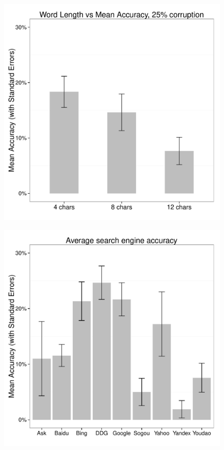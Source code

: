 \documentclass{csfourzero}
\begin{document}
\begin{figure}[H]
  \centering
  \begin{minipage}{.5\textwidth}
    \centering
    \includegraphics[width=\textwidth]{len_vs_acc}
    \label{fig:lengths}
  \end{minipage}%
  \begin{minipage}{.5\textwidth}
    \centering
    \includegraphics[width=\textwidth]{eng_vs_acc}
    \label{fig:searchengines}
  \end{minipage}
\end{figure}
\end{document}
